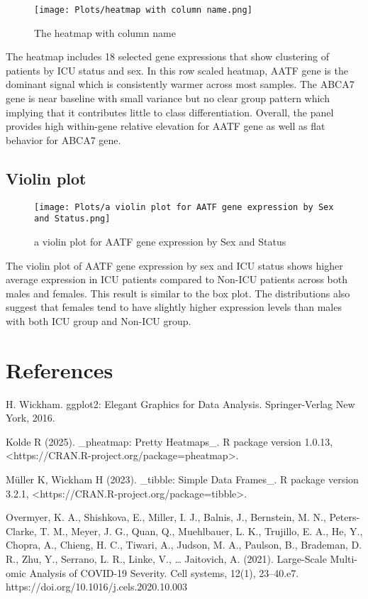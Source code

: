 \documentclass{article}
\begin{document}
\begin{figure}[H]
    \centering
    \texttt{[image: Plots/heatmap with column name.png]}
    \caption{The heatmap with column name}
    \label{fig:placeholder}
\end{figure}
The heatmap includes 18 selected gene expressions that show clustering of patients by ICU status and sex. In this row scaled heatmap, AATF gene is the dominant signal which is consistently warmer across most samples. The ABCA7 gene is near baseline with small variance but no clear group pattern which implying that it contributes little to class differentiation. Overall, the panel provides high within-gene relative elevation for AATF gene as well as flat behavior for ABCA7 gene.


\subsection{Violin plot}
\begin{figure}[H]
    \centering
    \texttt{[image: Plots/a violin plot for AATF gene expression by Sex and Status.png]}
    \caption{a violin plot for AATF gene expression by Sex and Status}
    \label{fig:placeholder}
\end{figure}
The violin plot of AATF gene expression by sex and ICU status shows higher average expression in ICU patients compared to Non-ICU patients across both males and females. This result is similar to the box plot. The distributions also suggest that females tend to have slightly higher expression levels than males with both ICU group and Non-ICU group.

\section{References}
H. Wickham. ggplot2: Elegant Graphics for Data Analysis. Springer-Verlag
  New York, 2016.

Kolde R (2025). _pheatmap: Pretty Heatmaps_. R package version 1.0.13,
  <https://CRAN.R-project.org/package=pheatmap>.

Müller K, Wickham H (2023). _tibble: Simple Data Frames_. R package
  version 3.2.1, <https://CRAN.R-project.org/package=tibble>.
  
Overmyer, K. A., Shishkova, E., Miller, I. J., Balnis, J., Bernstein, M. N., Peters-Clarke, T. M., Meyer, J. G., Quan, Q., Muehlbauer, L. K., Trujillo, E. A., He, Y., Chopra, A., Chieng, H. C., Tiwari, A., Judson, M. A., Paulson, B., Brademan, D. R., Zhu, Y., Serrano, L. R., Linke, V., … Jaitovich, A. (2021). Large-Scale Multi-omic Analysis of COVID-19 Severity. Cell systems, 12(1), 23–40.e7. https://doi.org/10.1016/j.cels.2020.10.003
\end{document}
